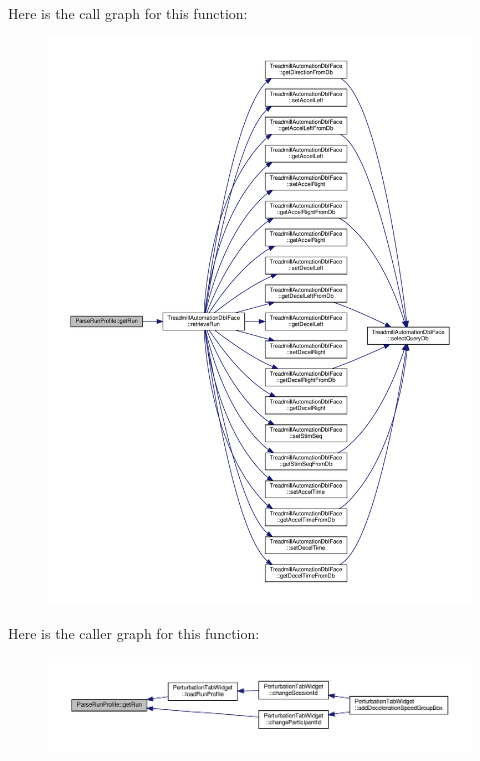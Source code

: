 Here is the call graph for this function\+:
\nopagebreak
\begin{figure}[H]
\begin{center}
\leavevmode
\includegraphics[width=350pt]{class_parse_run_profile_a1f064521af699320f5da111e9cb81625_cgraph}
\end{center}
\end{figure}
Here is the caller graph for this function\+:
\nopagebreak
\begin{figure}[H]
\begin{center}
\leavevmode
\includegraphics[width=350pt]{class_parse_run_profile_a1f064521af699320f5da111e9cb81625_icgraph}
\end{center}
\end{figure}
\mbox{\label{class_parse_run_profile_abb40056301c358e483699910dae9e83c}} 
